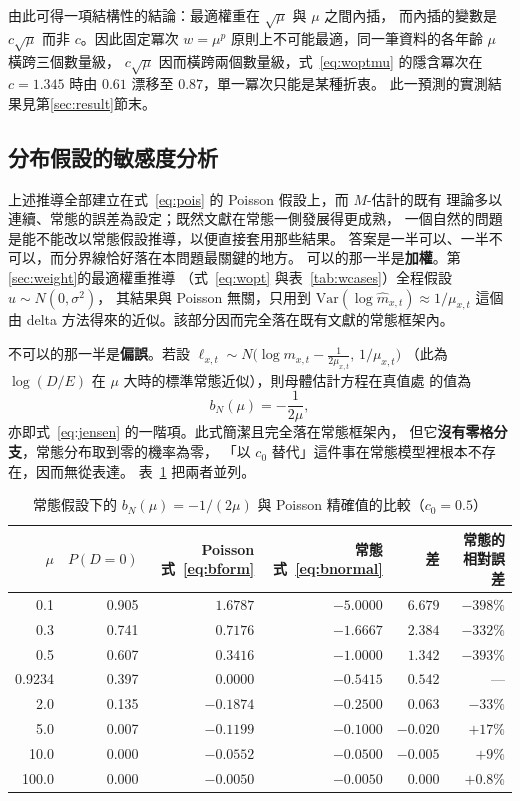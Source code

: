 \documentclass[UTF8, fontset=macnew, a4paper, 12pt]{ctexart}
\begin{document}
由此可得一項結構性的結論：最適權重在 $\sqrt{\mu}$ 與 $\mu$ 之間內插，
而內插的變數是 $c\sqrt{\mu}$ 而非 $c$。因此固定冪次 $w=\mu^{p}$
原則上不可能最適，同一筆資料的各年齡 $\mu$ 橫跨三個數量級，
$c\sqrt{\mu}$ 因而橫跨兩個數量級，式~\eqref{eq:woptmu} 的隱含冪次在
$c=1.345$ 時由 $0.61$ 漂移至 $0.87$，單一冪次只能是某種折衷。
此一預測的實測結果見第\ref{sec:result}節末。

\subsection{分布假設的敏感度分析}\label{sec:normal}

上述推導全部建立在式~\eqref{eq:pois} 的 Poisson 假設上，而 $M$-估計的既有
理論多以連續、常態的誤差為設定；既然文獻在常態一側發展得更成熟，
一個自然的問題是能不能改以常態假設推導，以便直接套用那些結果。
答案是一半可以、一半不可以，而分界線恰好落在本問題最關鍵的地方。
可以的那一半是\textbf{加權}。第\ref{sec:weight}的最適權重推導
（式~\eqref{eq:wopt} 與表~\ref{tab:wcases}）全程假設 $u\sim N(0,\sigma^2)$，
其結果與 Poisson 無關，只用到 $\mathrm{Var}(\log\hat m_{x,t})\approx1/\mu_{x,t}$
這個由 delta 方法得來的近似。該部分因而完全落在既有文獻的常態框架內。

不可以的那一半是\textbf{偏誤}。若設
$\ell_{x,t}\sim N\!\big(\log m_{x,t}-\tfrac{1}{2\mu_{x,t}},\,1/\mu_{x,t}\big)$
（此為 $\log(D/E)$ 在 $\mu$ 大時的標準常態近似），則母體估計方程在真值處
的值為
\begin{equation}\label{eq:bnormal}
b_N(\mu)=-\frac{1}{2\mu},
\end{equation}
亦即式~\eqref{eq:jensen} 的一階項。此式簡潔且完全落在常態框架內，
但它\textbf{沒有零格分支}，常態分布取到零的機率為零，
「以 $c_0$ 替代」這件事在常態模型裡根本不存在，因而無從表達。
表~\ref{tab:normal} 把兩者並列。

\begin{table}[H]
\centering
\caption{常態假設下的 $b_N(\mu)=-1/(2\mu)$ 與 Poisson 精確值的比較（$c_0=0.5$）}
\small
\begin{tabular}{rrrrrr}
\toprule
$\mu$ & $P(D=0)$ & Poisson 式~\eqref{eq:bform} & 常態 式~\eqref{eq:bnormal}
 & 差 & 常態的相對誤差\\
\midrule
0.1   & 0.905 & $1.6787$  & $-5.0000$ & $6.679$  & $-398\%$\\
0.3   & 0.741 & $0.7176$  & $-1.6667$ & $2.384$  & $-332\%$\\
0.5   & 0.607 & $0.3416$  & $-1.0000$ & $1.342$  & $-393\%$\\
0.9234& 0.397 & $0.0000$  & $-0.5415$ & $0.542$  & ---\\
2.0   & 0.135 & $-0.1874$ & $-0.2500$ & $0.063$  & $-33\%$\\
5.0   & 0.007 & $-0.1199$ & $-0.1000$ & $-0.020$ & $+17\%$\\
10.0  & 0.000 & $-0.0552$ & $-0.0500$ & $-0.005$ & $+9\%$\\
100.0 & 0.000 & $-0.0050$ & $-0.0050$ & $0.000$  & $+0.8\%$\\
\bottomrule
\end{tabular}
\label{tab:normal}
\end{table}
\end{document}
